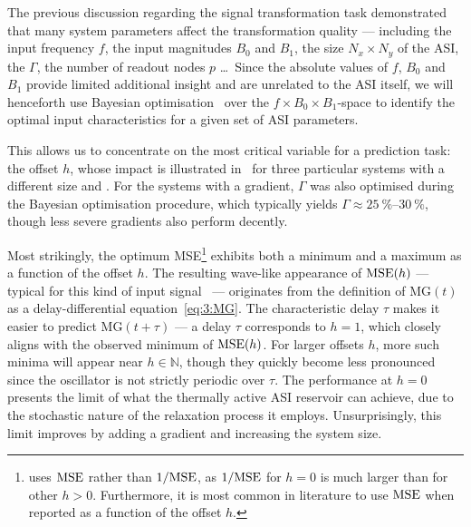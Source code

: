 The previous discussion regarding the signal transformation task demonstrated that many system parameters affect the transformation quality --- including the input frequency $f$, the input magnitudes $B_0$ and $B_1$, the size $N_x \times N_y$ of the ASI, the  $\Gamma$, the number of readout nodes $p$ \dots\,
Since the absolute values of $f$, $B_0$ and $B_1$ provide limited additional insight and are unrelated to the ASI itself, we will henceforth use Bayesian optimisation~\cite{BayesOpt_Mockus1975} over the $f \times B_0 \times B_1$-space to identify the optimal input characteristics for a given set of ASI parameters. \par %
This allows us to concentrate on the most critical variable for a prediction task: the offset $h$, whose impact is illustrated in~ for three particular systems with a different size and .
For the systems with a gradient, $\Gamma$ was also optimised during the Bayesian optimisation procedure, which typically yields $\Gamma \approx \SIrange{25}{30}{\percent}$, though less severe gradients also perform decently. \par
Most strikingly, the optimum MSE\footnote{
	 uses $\mathrm{MSE}$ rather than $1/\mathrm{MSE}$, as $1/\mathrm{MSE}$ for $h=0$ is much larger than for other $h > 0$.
	Furthermore, it is most common in literature to use $\mathrm{MSE}$ when reported as a function of the offset $h$.
} exhibits both a minimum and a maximum as a function of the offset $h$.
The resulting wave-like appearance of $\mathrm{MSE}(h)$ --- typical for this kind of input signal~\cite{AdaptiveProgrammableRC,ForecastingNeuralODE} --- originates from the definition of $\mathrm{MG}(t)$ as a delay-differential equation~\eqref{eq:3:MG}.
The characteristic delay $\tau$ makes it easier to predict $\mathrm{MG}(t + \tau)$ --- a delay $\tau$ corresponds to $h=1$, which closely aligns with the observed minimum of $\mathrm{MSE}(h)$.
For larger offsets $h$, more such minima will appear near $h \in \mathbb{N}$, though they quickly become less pronounced since the oscillator is not strictly periodic over $\tau$.
The performance at $h=0$ presents the limit of what the thermally active ASI reservoir can achieve, due to the stochastic nature of the relaxation process it employs.
Unsurprisingly, this limit improves by adding a gradient and increasing the system size.

